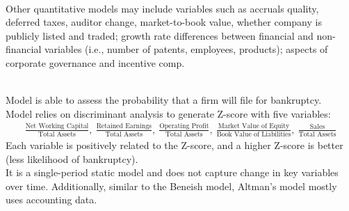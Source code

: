 \begin{remark} \\
Other quantitative models may include variables such as accruals quality, deferred taxes, auditor change, market-to-book value, whether company is publicly listed and traded; growth rate differences between financial and non-financial variables (i.e., number of patents, employees, products); aspects of corporate governance and incentive comp.
\end{remark}

\begin{method} \\
Model is able to assess the probability that a firm will file for bankruptcy.\\
Model relies on discriminant analysis to generate Z-score with five variables:
\begin{align}
\frac{\text{Net Working Capital}}{\text{Total Assets}}, \ \frac{\text{Retained Earnings}}{\text{Total Assets}}, \ \frac{\text{Operating Profit}}{\text{Total Assets}}, \  \frac{\text{Market Value of Equity}}{\text{Book Value of Liabilities}}, \ \frac{\text{Sales}}{\text{Total Assets}} \nonumber
\end{align}
Each variable is positively related to the Z-score, and a higher Z-score is better (less likelihood of bankruptcy).\\
It is a single-period static model and does not capture change in key variables over time. Additionally, similar to the Beneish model, Altman’s model mostly uses accounting data. 
\end{method}

